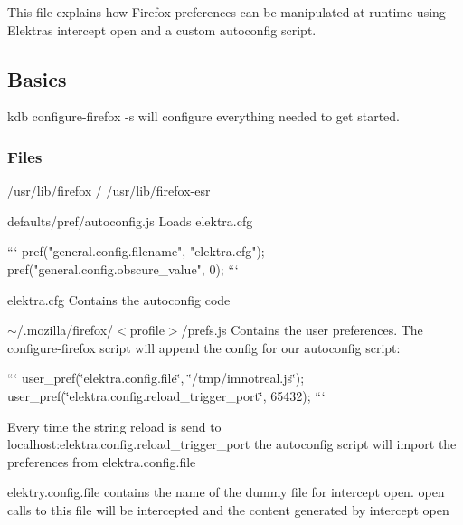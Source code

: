 This file explains how Firefox preferences can be manipulated at runtime using Elektras intercept open and a custom autoconfig script.

\subsection*{Basics}

{\ttfamily kdb configure-\/firefox -\/s} will configure everything needed to get started.

\subsubsection*{Files}


\begin{DoxyItemize}
\item {\ttfamily /usr/lib/firefox} / {\ttfamily /usr/lib/firefox-\/esr}
\begin{DoxyItemize}
\item {\ttfamily defaults/pref/autoconfig.\+js} Loads {\ttfamily elektra.\+cfg}
\end{DoxyItemize}
\end{DoxyItemize}

\begin{DoxyVerb} ```
 pref("general.config.filename", "elektra.cfg");
 pref("general.config.obscure_value", 0);
```
\end{DoxyVerb}

\begin{DoxyItemize}
\item {\ttfamily elektra.\+cfg} Contains the autoconfig code
\end{DoxyItemize}

{\ttfamily $\sim$/.mozilla/firefox/$<$profile$>$/prefs.js} Contains the user preferences. The configure-\/firefox script will append the config for our autoconfig script\+:

``` user\+\_\+pref(\char`\"{}elektra.\+config.\+file\char`\"{}, \char`\"{}/tmp/imnotreal.\+js\char`\"{}); user\+\_\+pref(\char`\"{}elektra.\+config.\+reload\+\_\+trigger\+\_\+port\char`\"{}, 65432); ```

Every time the string {\ttfamily reload} is send to localhost\+:{\ttfamily elektra.\+config.\+reload\+\_\+trigger\+\_\+port} the autoconfig script will import the preferences from {\ttfamily elektra.\+config.\+file}

{\ttfamily elektry.\+config.\+file} contains the name of the dummy file for {\ttfamily intercept open}. {\ttfamily open} calls to this file will be intercepted and the content generated by {\ttfamily intercept open}

